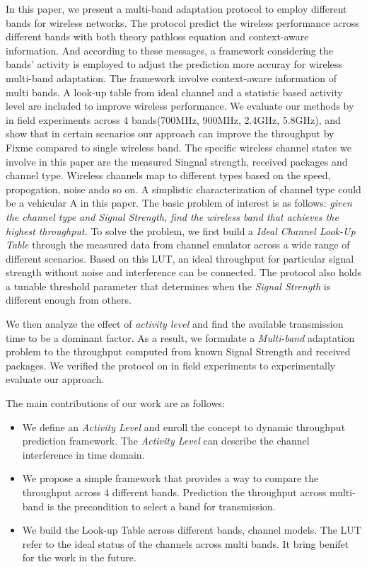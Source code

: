 In this paper, we present a multi-band adaptation protocol to employ different bands for wireless networks.
The protocol predict the wireless performance across different bands with both theory pathloss equation and context-aware information. And according to these messages, a framework considering the bands' activity is employed to adjust the prediction more accuray for wireless multi-band adaptation. 
The framework involve context-aware information of multi bands. A look-up table from ideal channel and a statistic based activity level are included to improve wireless performance. 
We evaluate our methods by in field experiments across 4 bands(700MHz, 900MHz, 2.4GHz, 5.8GHz), and show that in certain scenarios our approach can improve the throughput by Fixme compared to single wireless band.
The specific wireless channel states we involve in this paper are the measured Singnal strength, received packages and channel type. Wireless channels map to different types based on the speed, propogation, noise ando so on. A simplistic characterization of channel type could be a vehicular A in this paper. The basic problem of interest is as follows: \emph{given the channel type and Signal Strength, find the wireless band that achieves the highest throughput.}
To solve the problem, we first build a \emph{Ideal Channel Look-Up Table} through the measured data from channel emulator across a wide range of different scenarios. Based on this LUT, an ideal throughput for particular signal strength without noise and interference can be connected. The protocol also holds a tunable threshold parameter that determines when the \emph{Signal Strength} is different enough from others.

We then analyze the effect of \emph{activity level} and find the available transmission time to be a dominant factor. As a result, we formulate a \emph{Multi-band} adaptation problem to the throughput computed from known Signal Strength and received packages. We verified the protocol on in field experiments to experimentally evaluate our approach. 

The main contributions of our work are as follows:
\begin{itemize}
\item We define an \emph{Activity Level} and enroll the concept to dynamic throughput prediction framework. The \emph{Activity Level} can describe the channel interference in time domain.
\item We propose a simple framework that provides a way to compare the throughput across 4 different bands. Prediction the throughput across multi-band is the precondition to select a band for transmission.  
\item We build the Look-up Table across different bands, channel models. The LUT refer to the ideal status of the channels across multi bands. It bring benifet for the work in the future.
\end{itemize}

